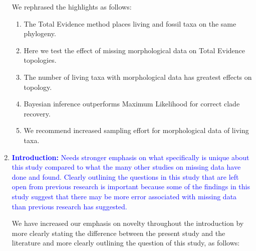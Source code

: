 \documentclass[12pt,letterpaper]{article}
\begin{document}
\begin{enumerate}
We rephrased the highlights as follows: 

\begin{enumerate}[(1)]
\item The Total Evidence method places living and fossil taxa on the same phylogeny.
\item Here we test the effect of missing morphological data on Total Evidence topologies.
\item The number of living taxa with morphological data has greatest effects on topology.
\item Bayesian inference outperforms Maximum Likelihood for correct clade recovery.
\item We recommend increased sampling effort for morphological data of living taxa.
\end{enumerate}

\item{\textcolor{blue}{\textbf{Introduction:} Needs stronger emphasis on what specifically is unique about this study compared to what the many other studies on missing data have done and found.
Clearly outlining the questions in this study that are left open from previous research is important because some of the findings in this study suggest that there may be more error associated with missing data than previous research has suggested.}}

We have increased our emphasis on novelty throughout the introduction by more clearly stating the difference between the present study and the literature and more clearly outlining the question of this study, as follows:



\end{enumerate}
\end{document}
